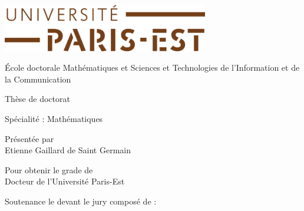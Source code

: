 

\thispagestyle{empty}
\begin{center}
\includegraphics[width=9cm]{head/logo_upe.png}


\vspace*{0.5cm}

{\large \'Ecole doctorale {\sc Math\'ematiques et Sciences et Technologies de l'Information et de la Communication}}

\vspace*{1cm}

{\huge {\sc Th\`ese de doctorat}}

\vspace*{0.5cm}

{\large Sp\'ecialit\'e : Math\'ematiques}

\vspace*{1cm}

{\large Pr\'esent\'ee par}\ \\[1ex]

{\huge {Etienne \sc Gaillard de Saint Germain}}

\vspace*{1cm}

{\large Pour obtenir le grade de \ \\[1ex]
{\sc Docteur de l'Universit\'e Paris-Est}}

\vspace*{1.2cm}

{\Huge {}}

\vspace*{0.3cm}

{\Huge {}}

\vspace*{0.5cm}

{\large {}}

\vspace*{1.5cm}

{\Large Soutenance le  devant le jury compos\'e de :}

\end{center}

